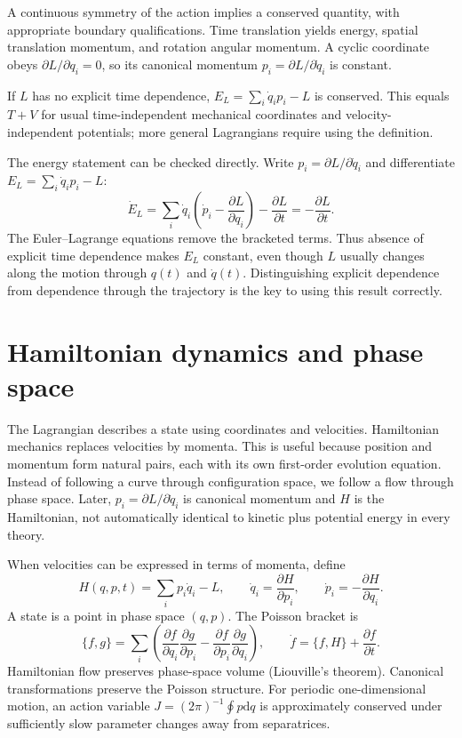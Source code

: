\documentclass[11pt,oneside]{book}
\newcommand{\dd}{\mathrm{d}}
\newcommand{\pd}[2]{\frac{\partial #1}{\partial #2}}
\theoremstyle{reviewstyle}
\begin{document}
A continuous symmetry of the action implies a conserved quantity, with appropriate boundary qualifications. Time translation yields energy, spatial translation momentum, and rotation angular momentum. A cyclic coordinate obeys $\partial L/\partial q_i=0$, so its canonical momentum
$p_i=\partial L/\partial\dot q_i$ is constant.

If $L$ has no explicit time dependence, $E_L=\sum_i\dot q_ip_i-L$ is conserved. This equals $T+V$ for usual time-independent mechanical coordinates and velocity-independent potentials; more general Lagrangians require using the definition.

The energy statement can be checked directly. Write $p_i=\partial L/\partial\dot q_i$ and differentiate $E_L=\sum_i\dot q_ip_i-L$:
\begin{equation}
\dot E_L=\sum_i\dot q_i\left(\dot p_i-\pd L{q_i}\right)-\pd Lt
=-\pd Lt.
\end{equation}
The Euler--Lagrange equations remove the bracketed terms. Thus absence of explicit time dependence makes $E_L$ constant, even though $L$ usually changes along the motion through $q(t)$ and $\dot q(t)$. Distinguishing explicit dependence from dependence through the trajectory is the key to using this result correctly.

\section{Hamiltonian dynamics and phase space}
The Lagrangian describes a state using coordinates and velocities. Hamiltonian mechanics replaces velocities by momenta. This is useful because position and momentum form natural pairs, each with its own first-order evolution equation. Instead of following a curve through configuration space, we follow a flow through phase space. Later, $p_i=\partial L/\partial\dot q_i$ is canonical momentum and $H$ is the Hamiltonian, not automatically identical to kinetic plus potential energy in every theory.

When velocities can be expressed in terms of momenta, define
\begin{equation}
H(q,p,t)=\sum_i p_i\dot q_i-L,
\qquad \dot q_i=\pd{H}{p_i},\qquad \dot p_i=-\pd{H}{q_i}.
\end{equation}
A state is a point in phase space $(q,p)$. The Poisson bracket is
\begin{equation}
\{f,g\}=\sum_i\left(\pd{f}{q_i}\pd{g}{p_i}-\pd{f}{p_i}\pd{g}{q_i}\right),\qquad
\dot f=\{f,H\}+\pd{f}{t}.
\end{equation}
Hamiltonian flow preserves phase-space volume (Liouville's theorem). Canonical transformations preserve the Poisson structure. For periodic one-dimensional motion, an action variable $J=(2\pi)^{-1}\oint p\dd q$ is approximately conserved under sufficiently slow parameter changes away from separatrices.
\end{document}
